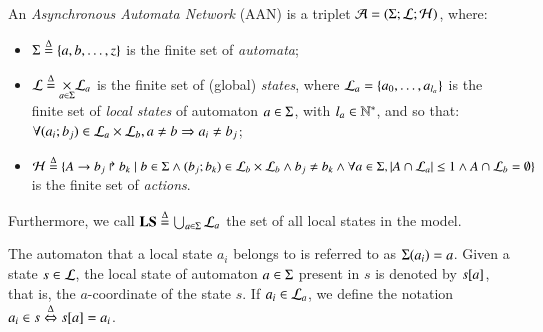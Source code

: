 \begin{definition}
\label{def:ph}
  An \emph{Asynchronous Automata Network} (AAN) is a triplet $\mathcal{A} = (\Sigma; \mathcal{L}; \mathcal{H})$,
  where:
  \begin{itemize}
    \item $\Sigma \stackrel{\Delta}= \{a, b, \dots, z\}$ is the finite set of \emph{automata};
    \item $\mathcal{L} \stackrel{\Delta}= \underset{a \in \Sigma}{\times} \mathcal{L}_a$ is the finite set of
      (global) \emph{states},
      where $\mathcal{L}_a = \{a_0, \ldots, a_{l_a}\}$ is the finite set of \emph{local states}
      of automaton $a \in \Sigma$, with $l_a \in \mathbb{N}^*$,
      and so that:
      $\forall (a_i; b_j) \in \mathcal{L}_a \times \mathcal{L}_b, a \neq b \Rightarrow a_i \neq b_j$;
    \item $\mathcal{H} \stackrel{\Delta}= \{A\rightarrow b_j\Rsh b_k \mid
      b \in \Sigma \wedge (b_j; b_k) \in \mathcal{L}_b \times \mathcal{L}_b \wedge
      b_j \neq b_k \wedge
      \forall a \in \Sigma, |A \cap \mathcal{L}_a| \leq 1 \wedge
      A \cap \mathcal{L}_b = \emptyset \}$ is the finite set of \emph{actions}.
  \end{itemize}
  Furthermore,
  we call $\mathbf{LS} \stackrel{\Delta}= \bigcup_{a \in \Sigma} \mathcal{L}_a$ the set of all local states in the model.
\end{definition}
%
\noindent
The automaton that a local state $a_i$ belongs to is referred to as $\Sigma(a_i) = a$.
Given a state $s\in \mathcal{L}$, the local state of automaton $a \in \Sigma$ present in $s$ is denoted by ${s[a]}$, that is, the $a$-coordinate of the state $s$.
If $a_i \in \mathcal{L}_a$, we define the notation $a_i \in s \stackrel{\Delta}\Leftrightarrow {s[a]} = a_i$.

